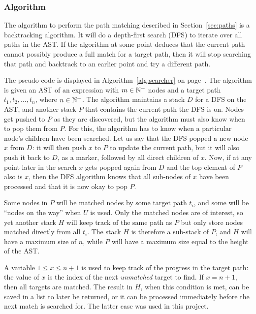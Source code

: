 \documentclass[a4paper,12pt]{article}
\begin{document}
\subsubsection{Algorithm}\label{sec:algo}
The algorithm to perform the path matching described in Section~\ref{sec:paths} is a backtracking
algorithm. It will do a depth-first search (DFS) to iterate over all paths in the AST. If
the algorithm at some point deduces that the current path cannot possibly produce a full
match for a target path, then it will stop searching that path and backtrack to an
earlier point and try a different path.

The pseudo-code is displayed in Algorithm~\ref{alg:searcher} on page~\pageref{alg:searcher}. The algorithm is given an
AST of an expression with $m \in \mathbb{N}^+$ nodes and a target path $t_1, t_2, \dots, t_n$, where $n \in \mathbb{N}^+$.
The algorithm maintains a stack $D$ for a DFS on the
AST, and another stack $P$ that contains the current path the DFS is on. Nodes get pushed
to $P$ as they are discovered, but the algorithm must also know when to pop them from $P$. For this,
the algorithm
has to know when a particular node's children have been searched. Let us say that the DFS
popped a new node $x$ from $D$: it will then push $x$ to $P$ to update the current path, but it will
also push it back to $D$, as a marker, followed by all direct children of $x$. Now, if at any point later in
the search $x$ gets popped again from $D$ and the top element of $P$ also is $x$, then the DFS
algorithm knows that all sub-nodes of $x$ have been processed and that it is now okay to pop $P$.

Some nodes in $P$ will be matched nodes by some target path $t_i$, and some will be ``nodes on the way''
when $U$ is used. Only the matched nodes are of interest, so yet another stack $H$
will keep track of the same path as $P$ but only store nodes matched directly from all $t_i$.
The stack $H$ is therefore a sub-stack of $P$, and
$H$ will have a maximum size of $n$, while $P$ will have a maximum size equal to
the height of the AST.

A variable $1 \leq x \leq n+1$ is used to keep track of the progress in the target path: the value of $x$ is the index of
the next \emph{unmatched} target to find. If $x = n+1$, then all targets are matched.
The result in $H$, when this condition is met, can be saved in a list to later be returned, or it can be processed immediately
before the next match is searched for. The latter case was used in this project.
\end{document}

